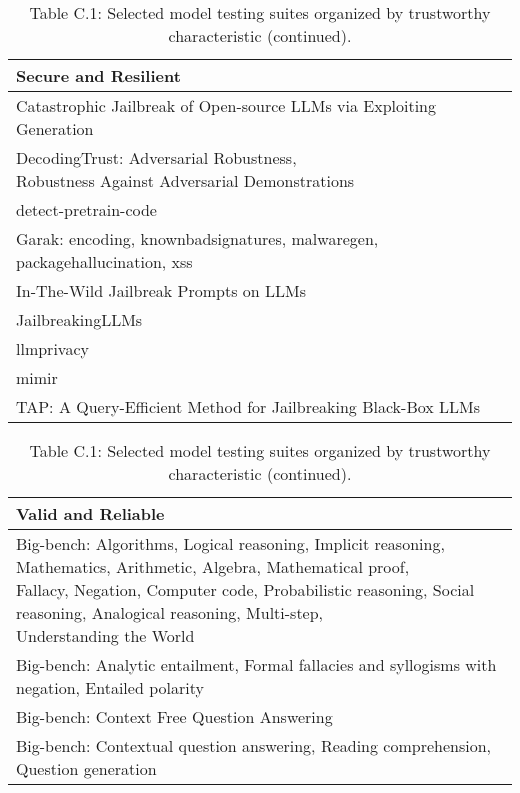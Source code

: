 \documentclass[fleqn]{article}
\begin{document}
\begin{table}[H]
	\caption*{Table C.1: Selected model testing suites organized by trustworthy characteristic (continued).}
	\label{tab:low_risk_measure_by_tc_cont}
	\footnotesize
	\begin{tabular}{l}
		\toprule
		\textbf{Secure and Resilient} \\
		\midrule
			Catastrophic Jailbreak of Open-source LLMs via Exploiting Generation \cite{huang2023catastrophic} \\
			\makecell[l]{DecodingTrust: Adversarial Robustness,\\\hspace{10pt} Robustness Against Adversarial Demonstrations} \\
			detect-pretrain-code \cite{detectpretraincode} \\
			Garak: encoding, knownbadsignatures, malwaregen, packagehallucination, xss \cite{garak} \\
			In-The-Wild Jailbreak Prompts on LLMs \cite{shen2023anything}\\
			JailbreakingLLMs \cite{chao2023jailbreaking}\\
			llmprivacy \\
			mimir \\
			TAP: A Query-Efficient Method for Jailbreaking Black-Box LLMs \cite{mehrotra2023tree}\\
		\bottomrule
	\end{tabular}
	\newline
	\vspace{10pt}
	\newline		
	\begin{tabular}{l}
		\toprule
		\textbf{Valid and Reliable} \\
		\midrule
			\makecell[l]{Big-bench: Algorithms, Logical reasoning, Implicit reasoning, Mathematics, Arithmetic, Algebra, Mathematical proof,\\\hspace{10pt} Fallacy, Negation, Computer code, Probabilistic reasoning, Social reasoning, Analogical reasoning, Multi-step,\\\hspace{10pt} Understanding the World} \\
		Big-bench: Analytic entailment, Formal fallacies and syllogisms with negation, Entailed polarity \\
		Big-bench: Context Free Question Answering \\
		Big-bench: Contextual question answering, Reading comprehension, Question generation \\

\end{tabular}
\end{table}
\end{document}
